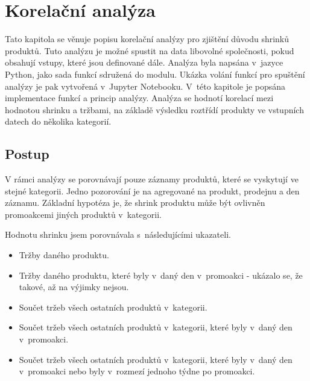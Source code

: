 \chapter{Korelační analýza}
\label{ch:korelacnianalyza}
Tato kapitola se věnuje popisu korelační analýzy pro zjištění důvodu shrinků produktů. Tuto analýzu je možné spustit na data libovolné společnosti, pokud obsahují vstupy, které jsou definované dále. Analýza byla napsána v~jazyce Python, jako sada funkcí sdružená do modulu. Ukázka volání funkcí pro spuštění analýzy je pak vytvořená v~Jupyter Notebooku. V~této kapitole je popsána implementace funkcí a princip analýzy. Analýza se hodnotí korelací mezi hodnotou shrinku a tržbami, na základě výsledku roztřídí produkty ve vstupních datech do několika kategorií. 




\section{Postup}
\label{sec:korpostup}
V rámci analýzy se porovnávají pouze záznamy produktů, které se vyskytují ve stejné kategorii. Jedno pozorování je na agregované na produkt, prodejnu a den záznamu. Základní hypotéza je, že shrink produktu může být ovlivněn promoakcemi jiných produktů v~kategorii.

Hodnotu shrinku jsem porovnávala s~následujícími ukazateli. 
\begin{itemize}
    \itemsep0em 
    \item Tržby daného produktu.
    \item Tržby daného produktu, které byly v~daný den v~promoakci - ukázalo se, že takové, až na výjimky nejsou.
    \item Součet tržeb všech ostatních produktů v~kategorii.
    \item Součet tržeb všech ostatních produktů v~kategorii, které byly v~daný den v~promoakci.
    \item Součet tržeb všech ostatních produktů v~kategorii, které byly v~daný den v~promoakci nebo byly v~rozmezí jednoho týdne po promoakci.
\end{itemize}

